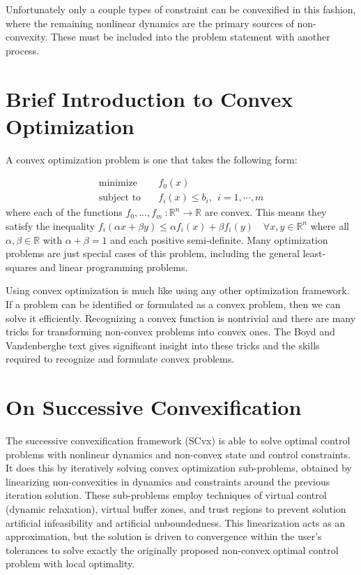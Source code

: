 Unfortunately only a couple types of constraint can be convexified in this fashion, where the remaining nonlinear dynamics are the primary sources of non-convexity. These must be included into the problem statement with another process.


\section{Brief Introduction to Convex Optimization}
A convex optimization problem is one that takes the following form:

\begin{align*}
	\text{minimize} \quad & f_0(x) \\ 
	\text{subject to} \quad & f_i(x) \leq b_i, \ \ i = 1, \cdots, m
\end{align*}
where each of the functions $f_0,...,f_m \ :\mathbb{R}^n \rightarrow \mathbb{R}$ are convex. This means they satisfy the inequality $f_i(\alpha x + \beta y) \leq \alpha f_i(x) + \beta f_i(y) \quad \forall x, y \in \mathbb{R}^n$ where all $\alpha, \beta \in \mathbb{R}$ with $\alpha + \beta = 1$ and each positive semi-definite. Many optimization problems are just special cases of this problem, including the general least-squares and linear programming problems.

Using convex optimization is much like using any other optimization framework. If a problem can be identified or formulated as a convex problem, then we can solve it efficiently. Recognizing a convex function is nontrivial and there are many tricks for transforming non-convex problems into convex ones. The Boyd and Vandenberghe text \cite{boyd2004convex} gives significant insight into these tricks and the skills required to recognize and formulate convex problems.

\section{On Successive Convexification}
The successive convexification framework (SCvx) is able to solve optimal control problems with nonlinear dynamics and non-convex state and control constraints. It does this by iteratively solving convex optimization sub-problems, obtained by linearizing non-convexities in dynamics and constraints around the previous iteration solution. These sub-problems employ techniques of virtual control (dynamic relaxation), virtual buffer zones, and trust regions to prevent solution artificial infeasibility and artificial unboundedness. This linearization acts as an approximation, but the solution is driven to convergence within the user's tolerances to solve exactly the originally proposed non-convex optimal control problem with local optimality.

